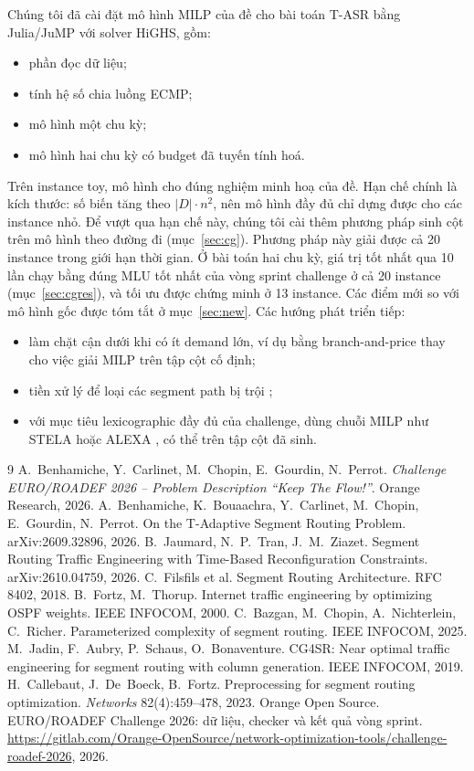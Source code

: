 \documentclass[11pt,a4paper]{article}
\begin{document}
Chúng tôi đã cài đặt mô hình MILP của đề cho bài toán T-ASR bằng Julia/JuMP với solver HiGHS, gồm:
\begin{itemize}
\item phần đọc dữ liệu;
\item tính hệ số chia luồng ECMP;
\item mô hình một chu kỳ;
\item mô hình hai chu kỳ có budget đã tuyến tính hoá.
\end{itemize}
Trên instance toy, mô hình cho đúng nghiệm minh hoạ của đề.
Hạn chế chính là kích thước: số biến tăng theo $|D|\cdot n^2$, nên mô hình đầy đủ chỉ dựng được cho các instance nhỏ.
Để vượt qua hạn chế này, chúng tôi cài thêm phương pháp sinh cột trên mô hình theo đường đi (mục~\ref{sec:cg}).
Phương pháp này giải được cả 20 instance trong giới hạn thời gian. Ở bài toán hai chu kỳ, giá trị tốt nhất qua 10 lần chạy bằng đúng MLU tốt nhất của vòng sprint challenge ở cả 20 instance (mục~\ref{sec:cgres}), và tối ưu được chứng minh ở 13 instance. Các điểm mới so với mô hình gốc được tóm tắt ở mục~\ref{sec:new}.
Các hướng phát triển tiếp:
\begin{itemize}
\item làm chặt cận dưới khi có ít demand lớn, ví dụ bằng branch-and-price thay cho việc giải MILP trên tập cột cố định;
\item tiền xử lý để loại các segment path bị trội \cite{callebaut2023};
\item với mục tiêu lexicographic đầy đủ của challenge, dùng chuỗi MILP như STELA hoặc ALEXA \cite{benhamiche2026}, có thể trên tập cột đã sinh.
\end{itemize}

\begin{thebibliography}{9}\small
{} A.~Benhamiche, Y.~Carlinet, M.~Chopin, E.~Gourdin, N.~Perrot. \emph{Challenge EURO/ROADEF 2026 -- Problem Description ``Keep The Flow!''}. Orange Research, 2026.
 A.~Benhamiche, K.~Bouaachra, Y.~Carlinet, M.~Chopin, E.~Gourdin, N.~Perrot. On the T-Adaptive Segment Routing Problem. arXiv:2609.32896, 2026.
 B.~Jaumard, N.~P.~Tran, J.~M.~Ziazet. Segment Routing Traffic Engineering with Time-Based Reconfiguration Constraints. arXiv:2610.04759, 2026.
 C.~Filsfils et al. Segment Routing Architecture. RFC 8402, 2018.
 B.~Fortz, M.~Thorup. Internet traffic engineering by optimizing OSPF weights. IEEE INFOCOM, 2000.
 C.~Bazgan, M.~Chopin, A.~Nichterlein, C.~Richer. Parameterized complexity of segment routing. IEEE INFOCOM, 2025.
 M.~Jadin, F.~Aubry, P.~Schaus, O.~Bonaventure. CG4SR: Near optimal traffic engineering for segment routing with column generation. IEEE INFOCOM, 2019.
 H.~Callebaut, J.~De~Boeck, B.~Fortz. Preprocessing for segment routing optimization. \emph{Networks} 82(4):459--478, 2023.
 Orange Open Source. EURO/ROADEF Challenge 2026: dữ liệu, checker và kết quả vòng sprint. \url{https://gitlab.com/Orange-OpenSource/network-optimization-tools/challenge-roadef-2026}, 2026.
\end{thebibliography}
\end{document}
